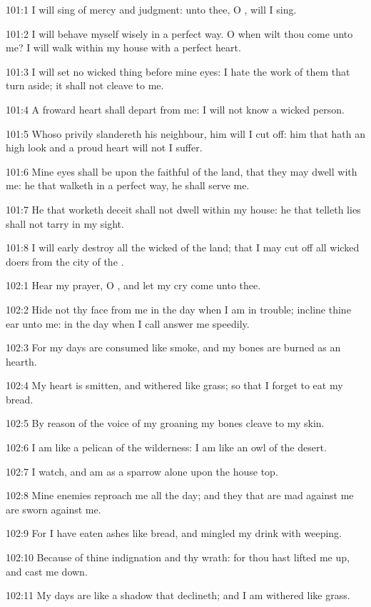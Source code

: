 101:1 I will sing of mercy and judgment: unto thee, O \LORD, will I sing.

101:2 I will behave myself wisely in a perfect way. O when wilt thou come unto me? I will walk within my house with a perfect heart.

101:3 I will set no wicked thing before mine eyes: I hate the work of them that turn aside; it shall not cleave to me.

101:4 A froward heart shall depart from me: I will not know a wicked person.

101:5 Whoso privily slandereth his neighbour, him will I cut off: him that hath an high look and a proud heart will not I suffer.

101:6 Mine eyes shall be upon the faithful of the land, that they may dwell with me: he that walketh in a perfect way, he shall serve me.

101:7 He that worketh deceit shall not dwell within my house: he that telleth lies shall not tarry in my sight.

101:8 I will early destroy all the wicked of the land; that I may cut off all wicked doers from the city of the \LORD.



102:1 Hear my prayer, O \LORD, and let my cry come unto thee.

102:2 Hide not thy face from me in the day when I am in trouble; incline thine ear unto me: in the day when I call answer me speedily.

102:3 For my days are consumed like smoke, and my bones are burned as an hearth.

102:4 My heart is smitten, and withered like grass; so that I forget to eat my bread.

102:5 By reason of the voice of my groaning my bones cleave to my skin.

102:6 I am like a pelican of the wilderness: I am like an owl of the desert.

102:7 I watch, and am as a sparrow alone upon the house top.

102:8 Mine enemies reproach me all the day; and they that are mad against me are sworn against me.

102:9 For I have eaten ashes like bread, and mingled my drink with weeping.

102:10 Because of thine indignation and thy wrath: for thou hast lifted me up, and cast me down.

102:11 My days are like a shadow that declineth; and I am withered like grass.

